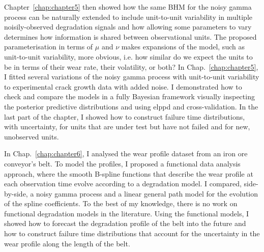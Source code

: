 Chapter~\ref{chap:chapter5} then showed how the same BHM for the noisy gamma process can be naturally extended to include unit-to-unit variability in multiple noisily-observed degradation signals and how allowing some parameters to vary determines how information is shared between observational units. The proposed parameterisation in terms of $\mu$ and $\nu$ makes expansions of the model, such as unit-to-unit variability, more obvious, i.e. how similar do we expect the units to be in terms of their wear rate, their volatility, or both? In Chap.~\ref{chap:chapter5}, I fitted several variations of the noisy gamma process with unit-to-unit variability to experimental crack growth data with added noise. I demonstrated how to check and compare the models in a fully Bayesian framework visually inspecting the posterior predictive distributions and using elppd and cross-validation. In the last part of the chapter, I showed how to construct failure time distributions, with uncertainty, for units that are under test but have not failed and for new, unobserved units.

In Chap.~\ref{chap:chapter6}, I analysed the wear profile dataset from an iron ore conveyor's belt. To model the profiles, I proposed a functional data analysis approach, where the smooth B-spline functions that describe the wear profile at each observation time evolve according to a degradation model. I compared, side-by-side, a noisy gamma process and a linear general path model for the evolution of the spline coefficients. To the best of my knowledge, there is no work on functional degradation models in the literature. Using the functional models, I showed how to forecast the degradation profile of the belt into the future and how to construct failure time distributions that account for the uncertainty in the wear profile along the length of the belt.


